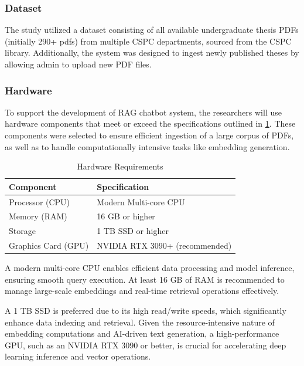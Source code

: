 \begin{refsection}
\subsubsection{Dataset}

The study utilized a dataset consisting of all available undergraduate thesis PDFs (initially 290+ pdfs) from multiple CSPC departments, sourced from the CSPC library. Additionally, the system was designed to ingest newly published theses by allowing admin to upload new PDF files.

\subsubsection{Hardware}

To support the development of RAG chatbot system, the researchers will use hardware components that meet or exceed the specifications outlined in \ref{tab:hardware_requirements}. These components were selected to ensure efficient ingestion of a large corpus of PDFs, as well as to handle computationally intensive tasks like embedding generation.

\begin{table}[H]
    \centering
    \caption{Hardware Requirements}
    \label{tab:hardware_requirements}
    \begin{tabular}{ll}
        \hline
        \textbf{Component}       & \textbf{Specification}                     \\ \hline
        Processor (CPU)          & Modern Multi-core CPU                      \\
        Memory (RAM)             & 16 GB or higher                            \\
        Storage                  & 1 TB SSD or higher                         \\
        Graphics Card (GPU)      & NVIDIA RTX 3090+ (recommended)             \\
        \hline
    \end{tabular}
\end{table}

A modern multi-core CPU enables efficient data processing and model inference, ensuring smooth query execution. At least 16 GB of RAM is recommended to manage large-scale embeddings and real-time retrieval operations effectively. 

A 1 TB SSD is preferred due to its high read/write speeds, which significantly enhance data indexing and retrieval. Given the resource-intensive nature of embedding computations and AI-driven text generation, a high-performance GPU, such as an NVIDIA RTX 3090 or better, is crucial for accelerating deep learning inference and vector operations.


\end{refsection}
